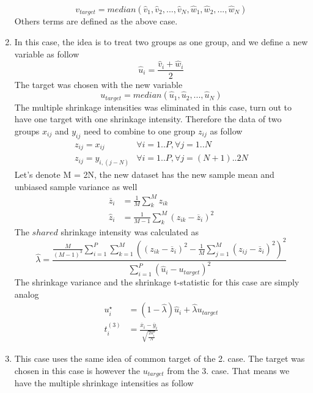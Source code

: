 \begin{enumerate}
	\begin{equation*}
		v_{target} = median(\hat v_1, \hat v_2, ..., \hat v_N, \hat w_1, \hat w_2, ..., \hat w_N)
	\end{equation*}
	Others terms are defined as the above case.
	\item In this case, the idea is to treat two groups as one group, and we define a new variable as follow
	\begin{equation}
		\hat u_i = \frac{\hat v_i + \hat w_i}{2}
	\end{equation}
	The target was chosen with the new variable
	\begin{equation*}
		u_{target} = median(\hat u_1, \hat u_2, ..., \hat u_N)
	\end{equation*}	
	The multiple shrinkage intensities was eliminated in this case, turn out to have one target with one shrinkage intensity. Therefore the data of two groups $x_{ij}$ and $y_{ij}$ need to combine to one group $z_{ij}$ as follow
	\begin{align*}
		z_{ij} = x_{ij} &\forall i=1..P, \forall j=1..N\\
		z_{ij} = y_{i,(j-N)} &\forall i=1..P, \forall j=(N+1)..2N
	\end{align*}
	Let's denote M = 2N, the new dataset has the new sample mean and unbiased sample variance as well
	\begin{align*}
		\overline{z}_i &= \frac{1}{M}\sum^M_k z_{ik} \\
		\hat z_i &= \frac{1}{M-1}\sum^M_k (z_{ik} - \overline{z}_i)^2
	\end{align*}	
	The $shared$ shrinkage intensity was calculated as
	\begin{equation*}
	\hat \lambda = \frac{\frac{M}{(M-1)^3}\sum^P_{i=1}\sum^M_{k=1}\left((z_{ik}-\overline{z}_i)^2 - \frac{1}{M}\sum_{j=1}^M(z_{ij}-\overline{z}_i)^2\right)^2}{\sum^P_{i=1}(\hat u_i - u_{target})^2}
	\end{equation*}		
	The shrinkage variance and the shrinkage t-statistic for this case are simply analog
	\begin{align*}
		u_i^\star &= (1-\hat \lambda)\hat u_i + \hat \lambda u_{target} \\
		t^{(3)}_i &= \frac{\overline{x}_i - \overline{y}_i}{\sqrt{ \frac{2u^\star_i}{N} }}
	\end{align*}	
	\item This case uses the same idea of common target of the 2. case. The target was chosen in this case is however the $u_{target}$ from the 3. case. That means we have the multiple shrinkage intensities as follow

\end{enumerate}
